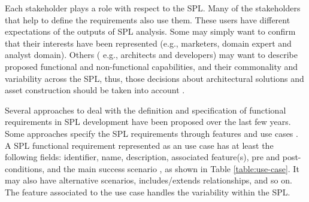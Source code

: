 Each stakeholder plays a role with respect to the \ac{SPL}. Many of the stakeholders
that help to define the requirements also use them. These users have different expectations of 
the outputs of \ac{SPL} analysis. Some may simply want to confirm that their interests have been represented 
(e.g., marketers, domain expert and analyst domain). Others ( e.g., architects and developers) may want to 
describe proposed functional and non-functional capabilities, and their commonality and variability across 
the \ac{SPL}, thus, those decisions about architectural solutions and asset construction should be taken into account 
\citep{chastek2001product}.

Several approaches to deal with the definition and specification of functional
requirements in \ac{SPL} development have been proposed over the last few years. Some approaches specify 
the \ac{SPL} requirements through features and use cases
\citep{griss1998integrating, bayer2000customizable, moon2005approach,
eriksson2005pluss, bonifacio2009modeling, alferez2011supporting,
mussbacher2012aourn, shaker2012feature, de2014defining}.
A \ac{SPL} functional requirement represented as an use case has at least the following fields: identifier, name, 
description, associated feature(s), pre and post-conditions, and the main
success scenario , as shown in Table \ref{table:use-case}. It may also have
alternative scenarios, includes/extends relationships, and so on. The feature associated to the use case handles the 
variability within the \ac{SPL}.

